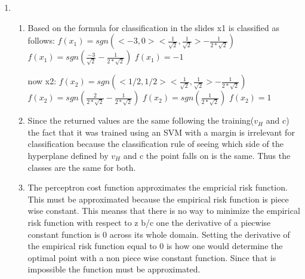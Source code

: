 \documentclass{article}
\begin{document}
	\maketitle
	\begin{enumerate}
		\item
		
		\begin{enumerate}
			\item Based on the formula for classification in the slides x1 is classified as follows:\newline
			$f(x_{1})=sgn(<-3,0><\frac{1}{\sqrt{2}},\frac{1}{\sqrt{2}}>-\frac{1}{2*\sqrt{2}})$ \newline
			$f(x_{1})=sgn(\frac{-3}{\sqrt{2}}-\frac{1}{2*\sqrt{2}})$
			\newline
			$f(x_{1})=-1$
			
			now x2:
			\newline
			$f(x_{2})=sgn(<1/2,1/2><\frac{1}{\sqrt{2}},\frac{1}{\sqrt{2}}>-\frac{1}{2*\sqrt{2}})$
			\newline
			$f(x_{2})=sgn(\frac{2}{2*\sqrt{2}}-\frac{1}{2*\sqrt{2}})$
			\newline
			$f(x_{2})=sgn(\frac{1}{2*\sqrt{2}})$
			\newline
			$f(x_{2})=1$
			\item Since the returned values are the same following the training($v_{H}$ and c) the fact that it was trained using an SVM with a margin is irrelevant for classification because the classification rule of seeing which side of the hyperplane defined by $v_{H}$ and c the point falls on is the same. Thus the classes are the same for both.
			\item The perceptron cost function approximates the empricial risk function. This must be approximated because the empirical risk function is piece wise constant. This meanss that there is no way to minimize the empirical risk function with respect to z b/c one the derivative of a piecwise constant function is 0 across its whole domain. Setting the derivative of the empirical risk function equal to 0 is how one would determine the optimal point with a non piece wise constant function. Since that is impossible the function must be approximated.
		\end{enumerate}
	\end{enumerate}
\end{document}
